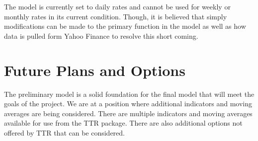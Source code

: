 \documentclass[11pt]{article}
\begin{document}
The model is currently set to daily rates and cannot be used for weekly or monthly rates in its current condition. Though, it is believed that simply modifications can be made to the primary function in the model as well as how data is pulled form Yahoo Finance to resolve this short coming.


\section*{\hspace{-.5cm} Future Plans and Options}\label{FP}
The preliminary model is a solid foundation for the final model that will meet the goals of the project. We are at a position where additional indicators and moving averages are being considered. There are multiple indicators and moving averages available for use from the TTR package. There are also additional options not offered by TTR that can be considered.
\end{document}
